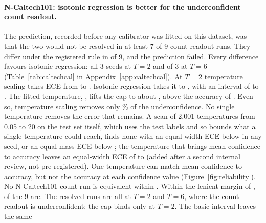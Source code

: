\documentclass[10pt]{article}
\begin{document}
\paragraph{N-Caltech101: isotonic regression is better for the underconfident count readout.} The prediction,
recorded before any calibrator was fitted on this dataset, was that the two would not be resolved
in at least 7 of 9 count-readout runs. They differ under the registered rule in %
\ncDiffer{} of 9, and the prediction failed. Every difference favours isotonic regression: all
3 seeds at $T=2$ and \ncDifferSix{} of 3 at $T=6$ (Table~\ref{tab:caltechcal} in %
Appendix~\ref{app:caltechcal}). At $T=2$ temperature scaling takes ECE from \hdNcTwoUncW{} to %
\hdNcTwoTempW. Isotonic regression takes it to \hdNcTwoIsoW, with an interval of %
\hdNcTwoIsoWLo{} to \hdNcTwoIsoWHi. The fitted temperature, \ccTemperatureTwo, lifts the cap to %
about \capAtTempNcTwo, above the accuracy of \ccAccTwo. Even so, temperature scaling removes only %
\tempRemovesNcTwo\% of the underconfidence. No single temperature removes the error that remains. %
A scan of 2,001 temperatures from 0.05 to 20 on the test set itself, which uses the test labels and
so bounds what a single temperature could reach, finds none with an equal-width ECE below \scanNcTwoLowW{} in any %
seed, or an equal-mass ECE below \scanNcTwoLowM; the temperature that brings mean confidence to %
accuracy leaves an equal-width ECE of \scanNcTwoMatchLo{} to \scanNcTwoMatchHi{} (added after a %
second internal review, not pre-registered). One temperature can match mean confidence to
accuracy, but not the accuracy at each confidence value (Figure~\ref{fig:reliability}). No N-Caltech101
count run is equivalent within \deltaMid. Within the lenient margin of \deltaWide, %
\tostNcCountBothWide{} of the 9 are. The \ncDiffer{} resolved runs are all at $T=2$ and $T=6$, where the count readout is
underconfident; the cap binds only at $T=2$. The basic interval leaves the same \tostNcCountDifferBasic{} %
\end{document}
